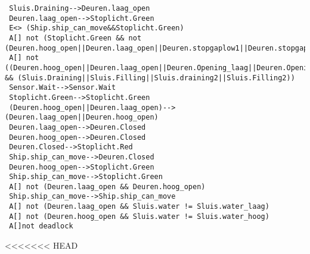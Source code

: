   \begin{verbatim}
 Sluis.Draining-->Deuren.laag_open
 Deuren.laag_open-->Stoplicht.Green
 E<> (Ship.ship_can_move&&Stoplicht.Green)
 A[] not (Stoplicht.Green && not (Deuren.hoog_open||Deuren.laag_open||Deuren.stopgaplow1||Deuren.stopgaplow2||Deuren.stopgaphigh1||Deuren.stopgaphigh2))
 A[] not ((Deuren.hoog_open||Deuren.laag_open||Deuren.Opening_laag||Deuren.Opening_hoog||Deuren.Closing_hoog||Deuren.Closing_laag) && (Sluis.Draining||Sluis.Filling||Sluis.draining2||Sluis.Filling2))
 Sensor.Wait-->Sensor.Wait
 Stoplicht.Green-->Stoplicht.Green
 (Deuren.hoog_open||Deuren.laag_open)-->(Deuren.laag_open||Deuren.hoog_open)
 Deuren.laag_open-->Deuren.Closed
 Deuren.hoog_open-->Deuren.Closed
 Deuren.Closed-->Stoplicht.Red
 Ship.ship_can_move-->Deuren.Closed
 Deuren.hoog_open-->Stoplicht.Green
 Ship.ship_can_move-->Stoplicht.Green
 A[] not (Deuren.laag_open && Deuren.hoog_open)
 Ship.ship_can_move-->Ship.ship_can_move
 A[] not (Deuren.laag_open && Sluis.water != Sluis.water_laag)
 A[] not (Deuren.hoog_open && Sluis.water != Sluis.water_hoog)
 A[]not deadlock
  \end{verbatim}
<<<<<<< HEAD
 
